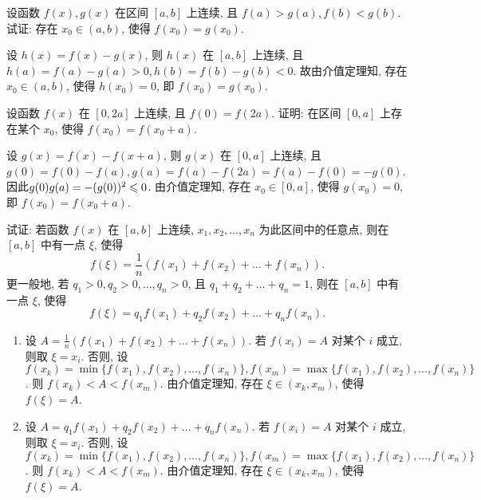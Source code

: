 \begin{exercise}[2.2.5]
    设函数 $f(x), g(x)$ 在区间 $[a,b]$ 上连续, 且 $f(a) > g(a), f(b) < g(b)$. 试证: 存在 $x_0 \in (a,b)$, 使得 $f(x_0)=g(x_0)$.
\end{exercise}

\begin{solution}
    设 $h(x) = f(x) - g(x)$, 则 $h(x)$ 在 $[a,b]$ 上连续, 且 $h(a) = f(a) - g(a) > 0, h(b) = f(b) - g(b) < 0$. 故由介值定理知, 存在 $x_0 \in (a,b)$, 使得 $h(x_0) = 0$, 即 $f(x_0) = g(x_0)$.
\end{solution}

\begin{exercise}[2.2.6]
    设函数 $f(x)$ 在 $[0, 2a]$ 上连续, 且 $f(0)=f(2a)$. 证明: 在区间 $[0,a]$ 上存在某个 $x_0$, 使得 $f(x_0) = f(x_0+a)$.
\end{exercise}

\begin{solution}
    设 $g(x) = f(x) - f(x+a)$, 则 $g(x)$ 在 $[0,a]$ 上连续, 且 $g(0) = f(0) - f(a), g(a) = f(a) - f(2a) = f(a) - f(0) = -g(0)$. 因此$g(0) g(a) = -(g(0))^2 \leqslant 0$. 由介值定理知, 存在 $x_0 \in [0,a]$, 使得 $g(x_0) = 0$, 即 $f(x_0) = f(x_0+a)$.
\end{solution}

\begin{exercise}[2.2.7]
    试证: 若函数 $f(x)$ 在 $[a,b]$ 上连续, $x_1, x_2, \dots, x_n$ 为此区间中的任意点, 则在 $[a,b]$ 中有一点 $\xi$, 使得
    $$ f(\xi) = \frac{1}{n}(f(x_1)+f(x_2)+\dots+f(x_n)). $$
    更一般地, 若 $q_1 > 0, q_2 > 0, \dots, q_n > 0$, 且 $q_1+q_2+\dots+q_n=1$, 则在 $[a,b]$ 中有一点 $\xi$, 使得
    $$ f(\xi) = q_1f(x_1)+q_2f(x_2)+\dots+q_nf(x_n). $$
\end{exercise}

\begin{solution}
    \begin{enumerate}
        \item 设 $A = \frac{1}{n}(f(x_1)+f(x_2)+\dots+f(x_n))$. 若 $f(x_i) = A$ 对某个 $i$ 成立, 则取 $\xi = x_i$. 否则, 设 $f(x_k) = \min\{f(x_1), f(x_2), \dots, f(x_n)\}, f(x_m) = \max\{f(x_1), f(x_2), \dots, f(x_n)\}$. 则 $f(x_k) < A < f(x_m)$. 由介值定理知, 存在 $\xi \in (x_k, x_m)$, 使得 $f(\xi) = A$.
        \item 设 $A = q_1f(x_1)+q_2f(x_2)+\dots+q_nf(x_n)$. 若 $f(x_i) = A$ 对某个 $i$ 成立, 则取 $\xi = x_i$. 否则, 设 $f(x_k) = \min\{f(x_1), f(x_2), \dots, f(x_n)\}, f(x_m) = \max\{f(x_1), f(x_2), \dots, f(x_n)\}$. 则 $f(x_k) < A < f(x_m)$. 由介值定理知, 存在 $\xi \in (x_k, x_m)$, 使得 $f(\xi) = A$.
    \end{enumerate}
\end{solution}

